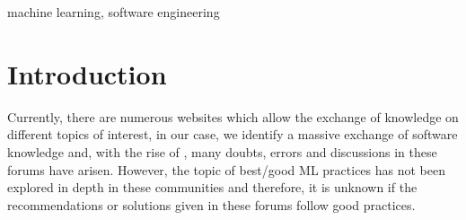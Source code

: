 \documentclass[conference]{IEEEtran}
\begin{document}
\begin{abstract}
Throughout this paper, we seek to carry out an analysis about which best/good practices of \ac{ML} are discussed in \acp{CQ+A} websites, and establish if these practices are being used in \ac{SE}. To achieve this we will follow a series of steps to extract information from different \acp{CQ+A} communities from \ac{STE} website, download the users dumps from the selected pages, preprocess it  and obtain the relevant information. In addition, we will analyze and collect information about posts that were already tagged, with possible best practices, and a plausible taxonomy of \ac{ML} best practice. This analyzed will be executed by (i) analyzing which of the best practices in the taxonomy are being used in \ac{SE} conference studies; (ii) surveying  the \ac{SE} articles authors, in order to understand which good practice have they followed. Subsequently, for the opposite phase, best/good software practices that are used in \ac{ML}, the goal is review related work and its state of the art.



\end{abstract}

\begin{IEEEkeywords}
machine learning, software engineering
\end{IEEEkeywords}

\section{Introduction}

Currently, there are numerous  websites which allow the exchange of knowledge on different topics of interest, in our case, we identify a massive exchange of software knowledge and, with the rise of , many doubts, errors and discussions in these forums have arisen. However, the topic of best/good \ac{ML} practices has not been explored in depth in these communities and therefore, it is unknown if the recommendations or solutions given in these forums follow good practices.
\end{document}
